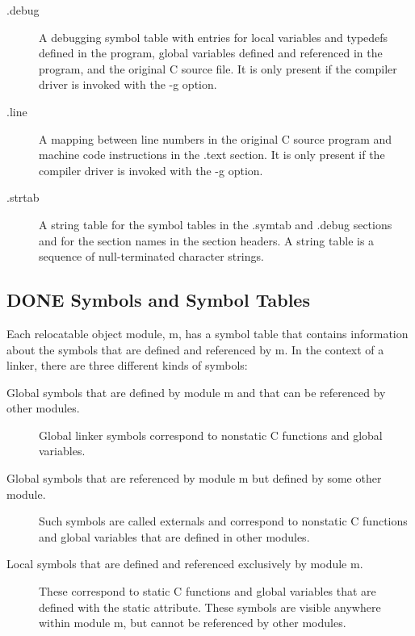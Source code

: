 \documentclass[11pt]{article}
\begin{document}
\begin{description}
\item[{.debug}] A debugging symbol table with entries for local variables and typedefs defined in the program, global variables defined and referenced in the program, and the original C source file. It is only present if the compiler driver is invoked with the -g option.\\
\item[{.line}] A mapping between line numbers in the original C source program and machine code instructions in the .text section. It is only present if the compiler driver is invoked with the -g option.\\
\item[{.strtab}] A string table for the symbol tables in the .symtab and .debug sections and for the section names in the section headers. A string table is a sequence of null-terminated character strings.\\
\end{description}



\subsection{{\bfseries\sffamily DONE} Symbols and Symbol Tables}
\label{sec:org71fd0c7}
Each relocatable object module, m, has a symbol table that contains information about the symbols that are defined and referenced by m. In the context of a linker, there are three different kinds of symbols:\\
\begin{description}
\item[{Global symbols that are defined by module m and that can be referenced by other modules.}] Global linker symbols correspond to nonstatic C functions and global variables.\\
\item[{Global symbols that are referenced by module m but defined by some other module.}] Such symbols are called externals and correspond to nonstatic C functions and global variables that are defined in other modules.\\
\item[{Local symbols that are defined and referenced exclusively by module m.}] These correspond to static C functions and global variables that are defined with the static attribute. These symbols are visible anywhere within module m, but cannot be referenced by other modules.\\
\end{description}
\end{document}
